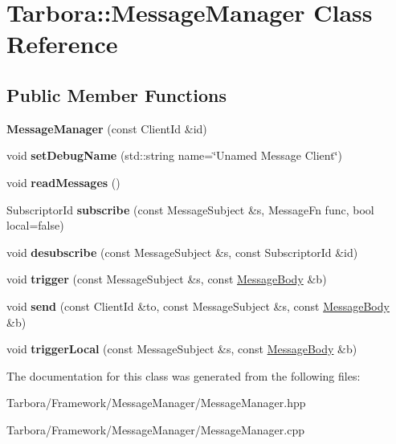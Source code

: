 \hypertarget{classTarbora_1_1MessageManager}{}\section{Tarbora\+:\+:Message\+Manager Class Reference}
\label{classTarbora_1_1MessageManager}
\subsection*{Public Member Functions}
\begin{DoxyCompactItemize}
\item 
\mbox{\label{classTarbora_1_1MessageManager_a5758af2ff6e101a98c942a02dedeb0f4}} 
{\bfseries Message\+Manager} (const Client\+Id \&id)
\item 
\mbox{\label{classTarbora_1_1MessageManager_a5801a36581a0382025917f06409db254}} 
void {\bfseries set\+Debug\+Name} (std\+::string name=\char`\"{}Unamed Message Client\char`\"{})
\item 
\mbox{\label{classTarbora_1_1MessageManager_ad68dc285c3bb042bb1637ffaef7ee177}} 
void {\bfseries read\+Messages} ()
\item 
\mbox{\label{classTarbora_1_1MessageManager_a7c16dc574f464294ff01ab2c2ee51a58}} 
Subscriptor\+Id {\bfseries subscribe} (const Message\+Subject \&s, Message\+Fn func, bool local=false)
\item 
\mbox{\label{classTarbora_1_1MessageManager_aa934ed541bdf40a535d192a503a2134e}} 
void {\bfseries desubscribe} (const Message\+Subject \&s, const Subscriptor\+Id \&id)
\item 
\mbox{\label{classTarbora_1_1MessageManager_a04d2dc17d828f73407a43d5311fdaa94}} 
void {\bfseries trigger} (const Message\+Subject \&s, const \hyperlink{classTarbora_1_1MessageBody}{Message\+Body} \&b)
\item 
\mbox{\label{classTarbora_1_1MessageManager_a0bb2e8fa30f288f5d63337bbe0047d31}} 
void {\bfseries send} (const Client\+Id \&to, const Message\+Subject \&s, const \hyperlink{classTarbora_1_1MessageBody}{Message\+Body} \&b)
\item 
\mbox{\label{classTarbora_1_1MessageManager_aa61e3e48bfcb3f845c35b2b65e2f39ab}} 
void {\bfseries trigger\+Local} (const Message\+Subject \&s, const \hyperlink{classTarbora_1_1MessageBody}{Message\+Body} \&b)
\end{DoxyCompactItemize}


The documentation for this class was generated from the following files\+:\begin{DoxyCompactItemize}
\item 
Tarbora/\+Framework/\+Message\+Manager/Message\+Manager.\+hpp\item 
Tarbora/\+Framework/\+Message\+Manager/Message\+Manager.\+cpp\end{DoxyCompactItemize}
